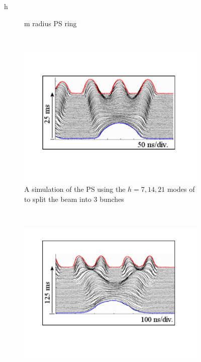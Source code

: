 \begin{figure}{h}
\begin{subfigure}[h]{0.45\textwidth}
{          m radius PS ring}\label{fig:ps_dipoles}
      \end{subfigure}
      ~ %
      \begin{subfigure}[h]{0.45\textwidth}
        \includegraphics[width=\textwidth]{Figures/LHC_Diagrams/LHC__PS__TripleBunchSplitting.pdf}
        \caption{A simulation of the PS using the $h=7,14,21$ modes of
        to split the beam into 3 bunches}\label{fig:ps_split3}
      \end{subfigure}
       ~ %
      \begin{subfigure}[h]{0.45\textwidth}
        \includegraphics[width=\textwidth]{Figures/LHC_Diagrams/LHC__PS__DoubleDoubleBunchSplitting.pdf}

\end{subfigure}
\end{figure}
